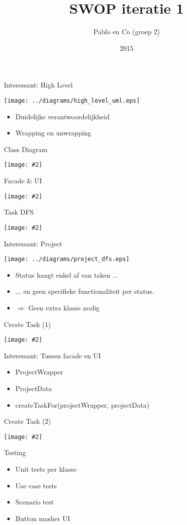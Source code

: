 \documentclass[mathserif,serif]{beamer}
\title{SWOP iteratie 1}
\author{Pablo en Co (groep 2)}
\institute{KU Leuven}
\date{2015}
\newcommand {\framedgraphic}[2] {
    \begin{frame}{#1}
        \begin{center}
            \texttt{[image: \#2]}
        \end{center}
    \end{frame}
}
\begin{document}
 
  \frame{\titlepage}

  \begin{frame}{Interessant: High Level}
      \begin{center}
      \texttt{[image: ../diagrams/high\_level\_uml.eps]}
        \begin{itemize}
        \item Duidelijke verantwoordelijkheid
        \item Wrapping en unwrapping
        \end{itemize}
      \end{center}
  \end{frame} 
  \framedgraphic{Class Diagram}{../diagrams/domain_uml.eps}
  \framedgraphic{Facade \& UI}{../diagrams/facade_uml.eps}
  \framedgraphic{Task DFS}{../diagrams/task_dfs.eps}
  \begin{frame}{Interessant: Project}
      \begin{center}
      \texttt{[image: ../diagrams/project\_dfs.eps]}
        \begin{itemize}
        \item Status hangt enkel af van taken ...
        \item ... en geen specifieke functionaliteit per status.
        \item $\Rightarrow$ Geen extra klasse nodig
        \end{itemize}
      \end{center}
  \end{frame} 
  \framedgraphic{Create Task (1)}{../diagrams/sequence_createTask_uml.eps}
  \begin{frame}{Interessant: Tussen facade en UI}
      \begin{center}
        \begin{itemize}
        \item ProjectWrapper
        \item ProjectData   
        \item createTaskFor(projectWrapper, projectData)
        \end{itemize}
      \end{center}
  \end{frame}
  \framedgraphic{Create Task (2)}{../diagrams/sequence_createTask_cancel_uml.eps}
  \begin{frame}{Testing}
      \begin{center}
        \begin{itemize}
        \item Unit tests per klasse
        \item Use case tests
        \item Scenario test
        \item Button masher UI
        \end{itemize}
      \end{center}
  \end{frame} 

\end{document}
